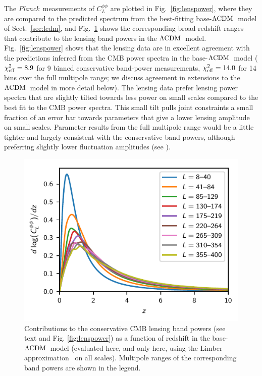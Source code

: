 \documentclass[longauth,traditabstract]{aa}
\def\Planck{\textit{Planck}}
\newcommand{\lcdm}{\texorpdfstring{{$\rm{\Lambda CDM}$}}{ΛCDM}}
\providecommand{\LCDM}{{$\rm{\Lambda CDM}$}}
\newcommand{\PlanckLensThree}{\citetalias{planck2016-l08}}
\begin{document}
The \Planck\ measurements of $C_L^{\phi\phi}$ are plotted in Fig.~\ref{fig:lenspower},
where they are compared to the predicted spectrum from the best-fitting
base-\lcdm\ model of Sect.~\ref{sec:lcdm}, and Fig.~\ref{fig:lenskernel} shows the corresponding broad redshift ranges that contribute to the lensing band powers in the \lcdm\ model.
Fig.~\ref{fig:lenspower} shows that the lensing data are in excellent agreement with the predictions inferred from the CMB power spectra in the base-\lcdm\ model ($\chi^2_{\rm eff} = 8.9$ for 9 binned conservative band-power measurements, $\chi^2_{\rm eff} =14.0$ for 14 bins over the full multipole range; we discuss agreement in extensions to the \lcdm\ model in more detail below). The lensing data prefer lensing power spectra that are slightly tilted towards less power on small scales compared to the best fit to the CMB power
spectra. This small tilt pulls joint constraints a small fraction of an error bar towards
parameters that give a lower lensing amplitude on small scales. Parameter results from the full multipole range would be a little tighter and largely consistent with the conservative band powers, although preferring slightly lower fluctuation amplitudes (see \PlanckLensThree).

\begin{figure}[tbp!]
\begin{center}
\includegraphics[width=\columnwidth]{lensing_kernels.pdf}
\end{center}
\caption{Contributions to the conservative CMB lensing band powers (see text and Fig. \ref{fig:lenspower}) as a function of redshift in the base-\LCDM\ model (evaluated here, and only here, using the Limber approximation~\citep{LoVerde:2008re} on all scales). Multipole ranges of the corresponding band powers are shown in the legend.
}
\label{fig:lenskernel}
\end{figure}
\end{document}

